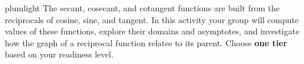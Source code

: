 \documentclass[10pt]{article}
\begin{document}
\namepartnerperiod

\vspace{0.10in}

\begin{scenariobox}{plumlight}
The secant, cosecant, and cotangent functions are built from the reciprocals
of cosine, sine, and tangent. In this activity your group will compute values
of these functions, explore their domains and asymptotes, and investigate
how the graph of a reciprocal function relates to its parent. Choose
\textbf{one tier} based on your readiness level.
\end{scenariobox}

\vspace{0.08in}
\end{document}
